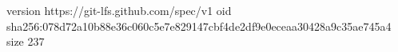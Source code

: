 version https://git-lfs.github.com/spec/v1
oid sha256:078d72a10b88e36c060c5e7e829147cbf4de2df9e0eceaa30428a9c35ae745a4
size 237
